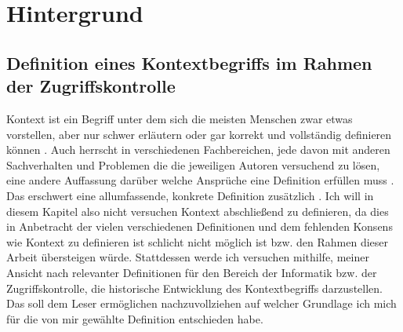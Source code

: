 
\chapter{Hintergrund}%
\label{cha:background}


\section{Definition eines Kontextbegriffs im Rahmen der Zugriffskontrolle}


Kontext ist ein Begriff unter dem sich die meisten Menschen zwar etwas vorstellen, aber nur schwer erläutern oder gar korrekt und vollständig definieren können \cite{dey_understanding_2001}. Auch herrscht in verschiedenen Fachbereichen, jede davon mit anderen Sachverhalten und Problemen die die jeweiligen Autoren versuchend zu lösen, eine andere Auffassung darüber welche Ansprüche eine Definition erfüllen muss . Das erschwert eine allumfassende, konkrete Definition zusätzlich \cite{hutchison_understanding_2005}. Ich will in diesem Kapitel also nicht versuchen Kontext abschließend zu definieren, da dies in Anbetracht der vielen verschiedenen Definitionen und dem fehlenden Konsens wie  Kontext zu definieren ist\cite{wei_liu_survey_2011,alegre_engineering_2016} schlicht nicht möglich ist bzw. den Rahmen dieser Arbeit übersteigen würde. Stattdessen werde ich versuchen mithilfe, meiner Ansicht nach relevanter Definitionen für den Bereich der Informatik bzw. der Zugriffskontrolle, die historische Entwicklung des Kontextbegriffs darzustellen. Das soll  dem Leser ermöglichen nachzuvollziehen auf welcher Grundlage ich mich für die von mir gewählte Definition entschieden habe.

